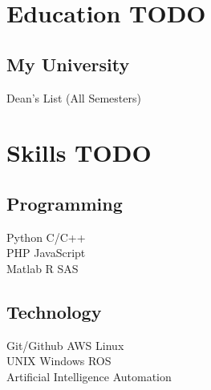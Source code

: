 \documentclass[]{deedy-resume-reversed}
\begin{document}
\begin{minipage}[t]{0.33\textwidth}


\section{Education TODO}

\subsection{My University}
Dean's List (All Semesters) \\
\sectionsep


\section{Skills TODO}
\subsection{Programming}
Python \textbullet{} C/C++ \\
PHP \textbullet{} JavaScript \\
Matlab \textbullet{} R \textbullet{} SAS \\
\sectionsep

\subsection{Technology}
Git/Github \textbullet{} AWS \textbullet{} Linux \\
UNIX \textbullet{} Windows \textbullet{} ROS \\
Artificial Intelligence \textbullet{} Automation \\
\sectionsep




\end{minipage}
\end{document}
